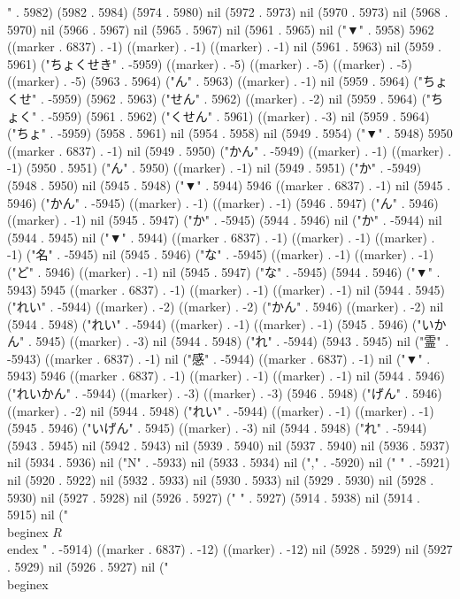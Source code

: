 " . 5982) (5982 . 5984) (5974 . 5980) nil (5972 . 5973) nil (5970 . 5973) nil (5968 . 5970) nil (5966 . 5967) nil (5965 . 5967) nil (5961 . 5965) nil ("▼" . 5958) 5962 ((marker . 6837) . -1) ((marker) . -1) ((marker) . -1) nil (5961 . 5963) nil (5959 . 5961) ("ちょくせき" . -5959) ((marker) . -5) ((marker) . -5) ((marker) . -5) ((marker) . -5) (5963 . 5964) ("ん" . 5963) ((marker) . -1) nil (5959 . 5964) ("ちょくせ" . -5959) (5962 . 5963) ("せん" . 5962) ((marker) . -2) nil (5959 . 5964) ("ちょく" . -5959) (5961 . 5962) ("くせん" . 5961) ((marker) . -3) nil (5959 . 5964) ("ちょ" . -5959) (5958 . 5961) nil (5954 . 5958) nil (5949 . 5954) ("▼" . 5948) 5950 ((marker . 6837) . -1) nil (5949 . 5950) ("かん" . -5949) ((marker) . -1) ((marker) . -1) (5950 . 5951) ("ん" . 5950) ((marker) . -1) nil (5949 . 5951) ("か" . -5949) (5948 . 5950) nil (5945 . 5948) ("▼" . 5944) 5946 ((marker . 6837) . -1) nil (5945 . 5946) ("かん" . -5945) ((marker) . -1) ((marker) . -1) (5946 . 5947) ("ん" . 5946) ((marker) . -1) nil (5945 . 5947) ("か" . -5945) (5944 . 5946) nil ("か" . -5944) nil (5944 . 5945) nil ("▼" . 5944) ((marker . 6837) . -1) ((marker) . -1) ((marker) . -1) ("名" . -5945) nil (5945 . 5946) ("な" . -5945) ((marker) . -1) ((marker) . -1) ("ど" . 5946) ((marker) . -1) nil (5945 . 5947) ("な" . -5945) (5944 . 5946) ("▼" . 5943) 5945 ((marker . 6837) . -1) ((marker) . -1) ((marker) . -1) nil (5944 . 5945) ("れい" . -5944) ((marker) . -2) ((marker) . -2) ("かん" . 5946) ((marker) . -2) nil (5944 . 5948) ("れい" . -5944) ((marker) . -1) ((marker) . -1) (5945 . 5946) ("いかん" . 5945) ((marker) . -3) nil (5944 . 5948) ("れ" . -5944) (5943 . 5945) nil ("霊" . -5943) ((marker . 6837) . -1) nil ("感" . -5944) ((marker . 6837) . -1) nil ("▼" . 5943) 5946 ((marker . 6837) . -1) ((marker) . -1) ((marker) . -1) nil (5944 . 5946) ("れいかん" . -5944) ((marker) . -3) ((marker) . -3) (5946 . 5948) ("げん" . 5946) ((marker) . -2) nil (5944 . 5948) ("れい" . -5944) ((marker) . -1) ((marker) . -1) (5945 . 5946) ("いげん" . 5945) ((marker) . -3) nil (5944 . 5948) ("れ" . -5944) (5943 . 5945) nil (5942 . 5943) nil (5939 . 5940) nil (5937 . 5940) nil (5936 . 5937) nil (5934 . 5936) nil ("N" . -5933) nil (5933 . 5934) nil ("," . -5920) nil (" " . -5921) nil (5920 . 5922) nil (5932 . 5933) nil (5930 . 5933) nil (5929 . 5930) nil (5928 . 5930) nil (5927 . 5928) nil (5926 . 5927) (" " . 5927) (5914 . 5938) nil (5914 . 5915) nil (" \\begin{ex}
 $R$
 \\end{ex}
" . -5914) ((marker . 6837) . -12) ((marker) . -12) nil (5928 . 5929) nil (5927 . 5929) nil (5926 . 5927) nil ("
  \\begin{ex}
   
